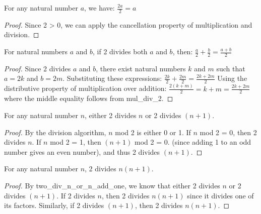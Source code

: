 \begin{lemma}
\label{mul_div_2}
\leanok
For any natural number $a$, we have:
$\frac{2a}{2} = a$
\end{lemma}
\begin{proof}
\leanok    
Since 2 > 0, we can apply the cancellation property of multiplication and division.
\end{proof}

\begin{lemma}
\label{div_two_add_even}
\leanok
For natural numbers $a$ and $b$, if 2 divides both $a$ and $b$, then:
$\frac{a}{2} + \frac{b}{2} = \frac{a + b}{2}$
\end{lemma}
\begin{proof}
\leanok
{}
Since 2 divides $a$ and $b$, there exist natural numbers $k$ and $m$ such that $a = 2k$ and $b = 2m$.
Substituting these expressions:
$\frac{2k}{2} + \frac{2m}{2} = \frac{2k + 2m}{2}$
Using the distributive property of multiplication over addition:
$\frac{2(k + m)}{2} = k + m = \frac{2k + 2m}{2}$
where the middle equality follows from mul\_div\_2.
\end{proof}

\begin{lemma}
\label{two_div_n_or_n_add_one}
\leanok

For any natural number $n$, either 2 divides $n$ or 2 divides $(n+1)$.
\end{lemma}
\begin{proof}
\leanok
By the division algorithm, $n$ mod 2 is either 0 or 1.
If $n$ mod 2 = 0, then 2 divides $n$.
If $n$ mod 2 = 1, then $(n+1)$ mod 2 = 0. (since adding 1 to an odd number gives an even number), and thus 2 divides $(n+1)$.
\end{proof}

\begin{lemma} 
\label{n_n_plus_1_even}
\leanok
For any natural number $n$, 2 divides $n(n+1)$.
\end{lemma}
\begin{proof}
\leanok
{}
By two\_div\_n\_or\_n\_add\_one, we know that either 2 divides $n$ or 2 divides $(n+1)$.
If 2 divides $n$, then 2 divides $n(n+1)$ since it divides one of its factors.
Similarly, if 2 divides $(n+1)$, then 2 divides $n(n+1)$.
\end{proof}

